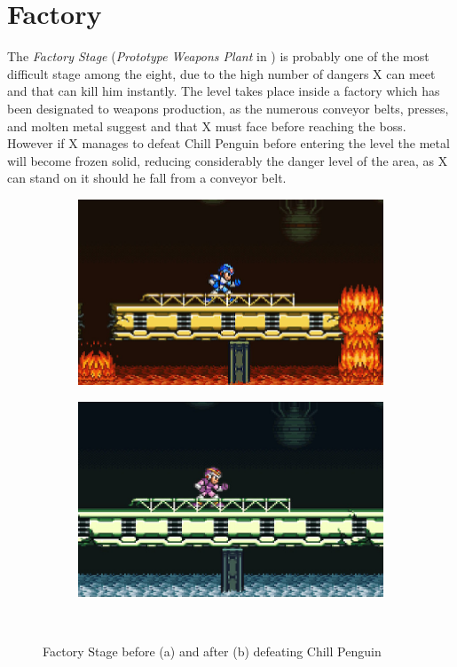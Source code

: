 \section{Factory} 
The \textit{Factory Stage} (\textit{Prototype Weapons Plant} in \mhx)  is probably one of the most difficult stage among the eight, due to the high number of dangers X can meet and that can kill him instantly. The level takes place inside a factory which has been designated to weapons production, as the numerous conveyor belts, presses, and molten metal suggest and that X must face before reaching the boss. However if X manages to defeat Chill Penguin before entering the level the metal will become frozen solid, reducing considerably the danger level of the area, as X can stand on it should he fall from a conveyor belt.
\begin{figure}[h]
	\centering
	\begin{subfigure}{0.49\textwidth}
		\centering
		\includegraphics[width=\linewidth]{figures/X1/Flame_mammoth/Flame_fire.jpg}
		\caption{}
	\end{subfigure}
	\begin{subfigure}{0.465\textwidth}
		\centering
		\includegraphics[width=\linewidth]{figures/X1/Flame_mammoth/Flame_frozen.jpg}
		\caption{}
	\end{subfigure}\\
	\caption{Factory Stage before (a) and after (b)  defeating Chill Penguin}
\end{figure}

